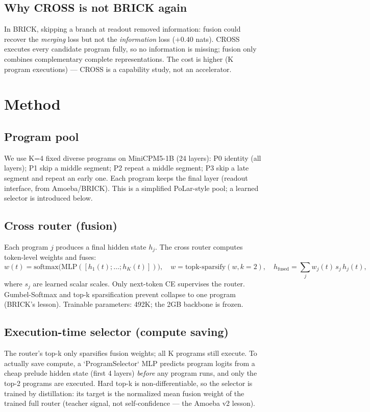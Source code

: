 \documentclass[11pt,a4paper]{article}
\begin{document}
\subsection{Why CROSS is not BRICK again}
In BRICK, skipping a branch at readout removed information: fusion could recover
the \emph{merging} loss but not the \emph{information} loss ($+0.40$ nats). CROSS
executes every candidate program fully, so no information is missing; fusion only
combines complementary complete representations. The cost is higher (K program
executions) --- CROSS is a capability study, not an accelerator.

\section{Method}

\subsection{Program pool}
We use K=4 fixed diverse programs on MiniCPM5-1B (24 layers): P0 identity (all
layers); P1 skip a middle segment; P2 repeat a middle segment; P3 skip a late
segment and repeat an early one. Each program keeps the final layer (readout
interface, from Amoeba/BRICK). This is a simplified PoLar-style pool; a learned
selector is introduced below.

\subsection{Cross router (fusion)}
Each program $j$ produces a final hidden state $h_j$. The cross router computes
token-level weights and fuses:
\[
  w(t)=\mathrm{softmax}\big(\mathrm{MLP}([h_1(t);\ldots;h_K(t)])\big),\quad
  w=\mathrm{topk\text{-}sparsify}(w,k{=}2),\quad
  h_{\mathrm{fused}}=\sum_j w_j(t)\,s_j\,h_j(t),
\]
where $s_j$ are learned scalar scales. Only next-token CE supervises the router.
Gumbel-Softmax and top-k sparsification prevent collapse to one program (BRICK's
lesson). Trainable parameters: 492K; the 2GB backbone is frozen.

\subsection{Execution-time selector (compute saving)}
The router's top-k only sparsifies fusion weights; all K programs still execute.
To actually save compute, a `ProgramSelector` MLP predicts program logits from a
cheap prelude hidden state (first 4 layers) \emph{before} any program runs, and only
the top-2 programs are executed. Hard top-k is non-differentiable, so the selector
is trained by distillation: its target is the normalized mean fusion weight of the
trained full router (teacher signal, not self-confidence --- the Amoeba v2 lesson).
\end{document}
